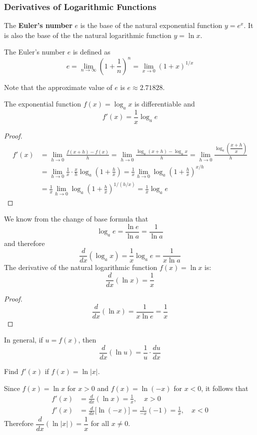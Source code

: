 \subsubsection*{Derivatives of Logarithmic Functions}
The \textbf{Euler's number} \(e\) is the base of the natural exponential
function \(y=e^x\).
It is also the base of the the natural logarithmic function \(y=\ln x\).
\begin{definition}
    The Euler's number \(e\) is defined as
    \[e=\lim_{n\to\infty}\left(1+\frac{1}{n}\right)^n
    =\lim_{x\to 0}(1+x)^{1/x}\]
\end{definition}
Note that the approximate value of \(e\) is \(e\approx2.71828\).
\begin{theorem}
    The exponential function \(f(x)=\log_a x\) is differentiable and
    \[f'(x)=\frac{1}{x}\log_a e\]
\end{theorem}
\begin{proof}
    \begin{align*}
        f'(x) &= \lim_{h\to 0}\frac{f(x+h)-f(x)}{h}
        = \lim_{h\to 0}\frac{\log_a(x+h)-\log_a x}{h}
        =\lim_{h\to 0}\frac{\log_a\left(\dfrac{x+h}{x}\right)}{h} \\
        &= \lim_{h\to 0}\frac{1}{x}\cdot\frac{x}{h}
        \log_a\left(1+\frac{h}{x}\right)
        = \frac{1}{x}
            \lim_{h\to 0}\log_a\left(1+\frac{h}{x}\right)^{x/h} \\
        &=\frac{1}{x}
            \lim_{h\to 0}\log_a\left(1+\frac{h}{x}\right)^{1/(h/x)}
        =\frac{1}{x}\log_a e
    \end{align*}
\end{proof}
We know from the change of base formula that
\[\log_a e=\frac{\ln e}{\ln a}=\frac{1}{\ln a}\]
and therefore
\[\frac{d}{dx}(\log_a x)=\frac{1}{x}\log_a e=\frac{1}{x\ln a}\]
The derivative of the natural logarithmic function \(f(x)=\ln x\) is:
\[\frac{d}{dx}(\ln x)=\frac{1}{x}\]
\begin{proof}
    \[\frac{d}{dx}(\ln x)=\frac{1}{x\ln e}=\frac{1}{x}\]
\end{proof}
In general, if \(u=f(x)\), then
\[\frac{d}{dx}(\ln u)=\frac{1}{u}\cdot\frac{du}{dx}\]
\begin{problem}
    Find \(f'(x)\) if \(f(x)=\ln|x|\).
\end{problem}
\begin{solution}
    Since \(f(x)=\ln x\) for \(x>0\) and \(f(x)=\ln(-x)\) for \(x<0\),
    it follows that
    \begin{align*}
        f'(x) &= \frac{d}{dx}(\ln x)=\frac{1}{x},\quad x>0 \\
        f'(x) &= \frac{d}{dx}\big[\ln(-x)\big]=\frac{1}{-x}(-1)
        =\frac{1}{x},\quad x<0
    \end{align*}
    Therefore \(\dfrac{d}{dx}(\ln|x|)=\dfrac{1}{x}\) for all \(x\neq 0\).
\end{solution}

